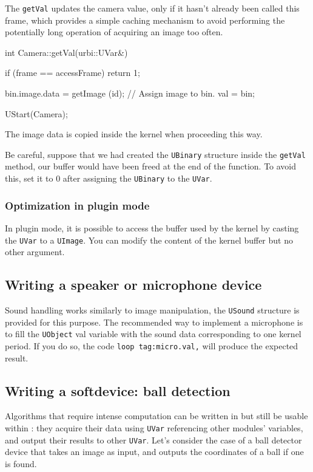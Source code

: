 The \lstinline{getVal} updates the camera value, only if it hasn't
already been called this frame, which provides a simple caching
mechanism to avoid performing the potentially long operation of
acquiring an image too often.

\begin{cxx}
int
Camera::getVal(urbi::UVar&)
{
  if (frame == accessFrame)
    return 1;

  bin.image.data = getImage (id);
  // Assign image to bin.
  val = bin;
}

UStart(Camera);
\end{cxx}

The image data is copied inside the kernel when proceeding this way.

Be careful, suppose that we had created the \lstinline{UBinary}
structure inside the \lstinline{getVal} method, our buffer would have
been freed at the end of the function. To avoid this, set it to 0
after assigning the \lstinline{UBinary} to the \lstinline{UVar}.

\subsubsection{Optimization in plugin mode}

In plugin mode, it is possible to access the buffer used by the kernel
by casting the \lstinline{UVar} to a \lstinline{UImage}. You can
modify the content of the kernel buffer but no other argument.

\subsection{Writing a speaker or microphone device}

Sound handling works similarly to image manipulation, the
\lstinline{USound} structure is provided for this purpose. The
recommended way to implement a microphone is to fill the
\lstinline{UObject} val variable with the sound data corresponding to
one kernel period. If you do so, the \urbi code
\lstinline{loop tag:micro.val,} will produce the expected result.

\subsection{Writing a softdevice: ball detection}

Algorithms that require intense computation can be written in \Cxx but
still be usable within \urbi: they acquire their data using
\lstinline{UVar} referencing other modules' variables, and output
their results to other \lstinline{UVar}. Let's consider the case of a
ball detector device that takes an image as input, and outputs the
coordinates of a ball if one is found.

